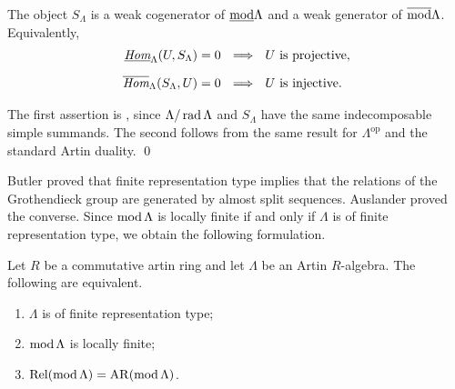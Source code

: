 \documentclass[11pt, twoside]{article}
\numberwithin{equation}{section}
\def\Hom{\mbox{Hom}}
\begin{document}
\begin{lemma}\label{lem:module-detectors}
The object $S_\Lambda$ is a weak cogenerator of
$\underline{\operatorname{mod}}\Lambda$ and a weak generator of
$\overline{\operatorname{mod}}\Lambda$.  Equivalently,
\begin{align*}
 {\rm\underline{\emph{\Hom}}}_\Lambda(U,S_\Lambda)=0
 &~~\Longrightarrow~~U\text{ is projective},\\[2mm]
 {\rm\overline{ \emph{\Hom}}}_\Lambda(S_\Lambda,U)=0
 &~~\Longrightarrow~~ U\text{ is injective}.
\end{align*}
\end{lemma}

\proof The first assertion is \cite[Proposition~4.7]{Enomoto2019}, since
$\Lambda/\operatorname{rad}\Lambda$ and $S_\Lambda$ have the same indecomposable simple
summands.  The second follows from the same result for
$\Lambda^{\mathrm{op}}$ and the standard Artin duality.  \qed

\vspace{2mm}
Butler \cite{Butler1981} proved that finite representation type implies that the relations of
the Grothendieck group are generated by almost split sequences.  Auslander
\cite{Auslander1984} proved the converse.  Since $\operatorname{mod}\Lambda$ is locally
finite if and only if $\Lambda$ is of finite representation type, we obtain
the following formulation.

\begin{theorem}\label{thm:module}{\rm\cite{Butler1981,Auslander1984}}
Let $R$ be a commutative artin ring and let $\Lambda$ be an Artin
$R$-algebra.  The following are equivalent.
\begin{enumerate}[label=\textup{(\arabic*)}]
\item $\Lambda$ is of finite representation type;
\item $\operatorname{mod}\Lambda$ is locally finite;
\item $\operatorname{Rel}(\operatorname{mod}\Lambda)=\operatorname{AR}(\operatorname{mod}\Lambda)$.
\end{enumerate}
\end{theorem}

\end{document}
